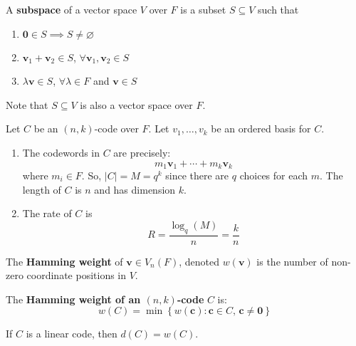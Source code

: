 \begin{defbox}
    \begin{definition}
        A \textbf{subspace} of a vector space $ V $ over $ F $ is a subset
        $ S\subseteq V $ such that
        \begin{enumerate}[V1]
            \item $ \bm{0}\in S \implies S\neq \varnothing $
            \item $ \bm{v}_1+\bm{v}_2\in S $, $ \forall \bm{v}_1,\bm{v}_2\in S $
            \item $ \lambda \bm{v}\in S $, $ \forall \lambda\in F $ and $ \bm{v}\in S $
        \end{enumerate}
        Note that $ S\subseteq V $ is also a vector space over $ F $.
    \end{definition}
\end{defbox}

Let $ C $ be an $ (n,k) $-code over $ F $. Let $ v_1,\ldots,v_k $ be
an ordered basis for $ C $.
\begin{enumerate}[(1)]
    \item The codewords in $ C $ are precisely:
          \[ m_1\bm{v}_1+\cdots +m_k\bm{v}_k \]
          where $ m_i\in F $. So, $ |C|=M=q^k $ since there are $ q $ choices for each $ m $.
          The length of $ C $ is $ n $ and has dimension $ k $.
    \item The rate of $ C $ is
          \[ R=\frac{\log_q(M)}{n} =\frac{k}{n} \]
\end{enumerate}

\begin{defbox}
    \begin{definition}
        The \textbf{Hamming weight} of $ \bm{v}\in V_n(F) $, denoted
        $ w(\bm{v}) $ is the number of non-zero coordinate positions in $ V $.
    \end{definition}
 \end{defbox}

\begin{defbox}
    \begin{definition}
        The \textbf{Hamming weight of an $ (n,k) $-code} $ C $ is:
        \[ w(C)=\min \left\{ w(\bm{c}):\bm{c}\in C,\,\bm{c}\neq \bm{0}\right\} \]
    \end{definition} 
\end{defbox}

\begin{thmbox}
    \begin{theorem}
        If $ C $ is a linear code, then $ d(C)=w(C) $.
    \end{theorem} 
\end{thmbox}

